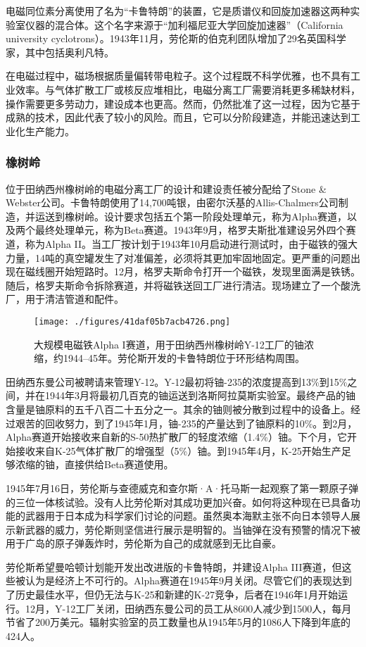 电磁同位素分离使用了名为“卡鲁特朗”的装置，它是质谱仪和回旋加速器这两种实验室仪器的混合体。这个名字来源于“加利福尼亚大学回旋加速器”（California university cyclotrons）。1943年11月，劳伦斯的伯克利团队增加了29名英国科学家，其中包括奥利凡特。

在电磁过程中，磁场根据质量偏转带电粒子。这个过程既不科学优雅，也不具有工业效率。与气体扩散工厂或核反应堆相比，电磁分离工厂需要消耗更多稀缺材料，操作需要更多劳动力，建设成本也更高。然而，仍然批准了这一过程，因为它基于成熟的技术，因此代表了较小的风险。而且，它可以分阶段建造，并能迅速达到工业化生产能力。
\subsubsection{橡树岭}
位于田纳西州橡树岭的电磁分离工厂的设计和建设责任被分配给了Stone & Webster公司。卡鲁特朗使用了14,700吨银，由密尔沃基的Allis-Chalmers公司制造，并运送到橡树岭。设计要求包括五个第一阶段处理单元，称为Alpha赛道，以及两个最终处理单元，称为Beta赛道。1943年9月，格罗夫斯批准建设另外四个赛道，称为Alpha II。当工厂按计划于1943年10月启动进行测试时，由于磁铁的强大力量，14吨的真空罐发生了对准偏差，必须将其更加牢固地固定。更严重的问题出现在磁线圈开始短路时。12月，格罗夫斯命令打开一个磁铁，发现里面满是铁锈。随后，格罗夫斯命令拆除赛道，并将磁铁送回工厂进行清洁。现场建立了一个酸洗厂，用于清洁管道和配件。
\begin{figure}[ht]
\centering
\texttt{[image: ./figures/41daf05b7acb4726.png]}
\caption{大规模电磁铁Alpha I赛道，用于田纳西州橡树岭Y-12工厂的铀浓缩，约1944–45年。劳伦斯开发的卡鲁特朗位于环形结构周围。} \label{fig_ONST_6}
\end{figure}
田纳西东曼公司被聘请来管理Y-12。Y-12最初将铀-235的浓度提高到13\%到15\%之间，并在1944年3月将最初几百克的铀运送到洛斯阿拉莫斯实验室。最终产品的铀含量是铀原料的五千八百二十五分之一。其余的铀则被分散到过程中的设备上。经过艰苦的回收努力，到了1945年1月，铀-235的产量达到了铀原料的10\%。到2月，Alpha赛道开始接收来自新的S-50热扩散厂的轻度浓缩（1.4\%）铀。下个月，它开始接收来自K-25气体扩散厂的增强型（5\%）铀。到1945年4月，K-25开始生产足够浓缩的铀，直接供给Beta赛道使用。

1945年7月16日，劳伦斯与查德威克和查尔斯·A·托马斯一起观察了第一颗原子弹的三位一体核试验。没有人比劳伦斯对其成功更加兴奋。如何将这种现在已具备功能的武器用于日本成为科学家们讨论的问题。虽然奥本海默主张不向日本领导人展示新武器的威力，劳伦斯则坚信进行展示是明智的。当铀弹在没有预警的情况下被用于广岛的原子弹轰炸时，劳伦斯为自己的成就感到无比自豪。

劳伦斯希望曼哈顿计划能开发出改进版的卡鲁特朗，并建设Alpha III赛道，但这些被认为是经济上不可行的。Alpha赛道在1945年9月关闭。尽管它们的表现达到了历史最佳水平，但仍无法与K-25和新建的K-27竞争，后者在1946年1月开始运行。12月，Y-12工厂关闭，田纳西东曼公司的员工从8600人减少到1500人，每月节省了200万美元。辐射实验室的员工数量也从1945年5月的1086人下降到年底的424人。
